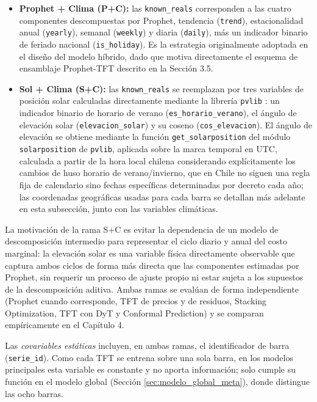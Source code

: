 \begin{itemize}
    \item \textbf{Prophet + Clima (P+C):} las \texttt{known\_reals} corresponden a las cuatro componentes descompuestas por Prophet, tendencia (\texttt{trend}), estacionalidad anual (\texttt{yearly}), semanal (\texttt{weekly}) y diaria (\texttt{daily}), más un indicador binario de feriado nacional (\texttt{is\_holiday}). Es la estrategia originalmente adoptada en el diseño del modelo híbrido, dado que motiva directamente el esquema de ensamblaje Prophet-TFT descrito en la Sección 3.5.
    \item \textbf{Sol + Clima (S+C):} las \texttt{known\_reals} se reemplazan por tres variables de posición solar calculadas directamente mediante la librería \texttt{pvlib} \cite{pvlib2023}: un indicador binario de horario de verano (\texttt{es\_horario\_verano}), el ángulo de elevación solar (\texttt{elevacion\_solar}) y su coseno (\texttt{cos\_elevacion}). El ángulo de elevación se obtiene mediante la función \texttt{get\_solarposition} del módulo \texttt{solarposition} de \texttt{pvlib}, aplicada sobre la marca temporal en UTC, calculada a partir de la hora local chilena considerando explícitamente los cambios de huso horario de verano/invierno, que en Chile no siguen una regla fija de calendario sino fechas específicas determinadas por decreto cada año; las coordenadas geográficas usadas para cada barra se detallan más adelante en esta subsección, junto con las variables climáticas.
\end{itemize}

La motivación de la rama S+C es evitar la dependencia de un modelo de descomposición intermedio para representar el ciclo diario y anual del costo marginal: la elevación solar es una variable física directamente observable que captura ambos ciclos de forma más directa que las componentes estimadas por Prophet, sin requerir un proceso de ajuste propio ni estar sujeta a los supuestos de la descomposición aditiva. Ambas ramas se evalúan de forma independiente (Prophet cuando corresponde, TFT de precios y de residuos, Stacking Optimization, TFT con DyT y Conformal Prediction) y se comparan empíricamente en el Capítulo 4.

Las \textit{covariables estáticas} incluyen, en ambas ramas, el identificador de barra (\texttt{serie\_id}). Como cada TFT se entrena sobre una sola barra, en los modelos principales esta variable es constante y no aporta información; solo cumple su función en el modelo global (Sección \ref{sec:modelo_global_meta}), donde distingue las ocho barras.

